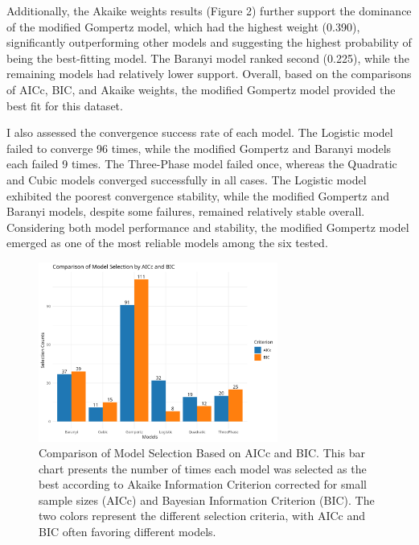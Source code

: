 \documentclass[12pt]{article}
\begin{document}
Additionally, the Akaike weights results (Figure 2) further support the dominance of the modified Gompertz model, which had the highest weight (0.390), significantly outperforming other models and suggesting the highest probability of being the best-fitting model. The Baranyi model ranked second (0.225), while the remaining models had relatively lower support. Overall, based on the comparisons of AICc, BIC, and Akaike weights, the modified Gompertz model provided the best fit for this dataset.

I also assessed the convergence success rate of each model. The Logistic model failed to converge 96 times, while the modified Gompertz and Baranyi models each failed 9 times. The Three-Phase model failed once, whereas the Quadratic and Cubic models converged successfully in all cases. The Logistic model exhibited the poorest convergence stability, while the modified Gompertz and Baranyi models, despite some failures, remained relatively stable overall. Considering both model performance and stability, the modified Gompertz model emerged as one of the most reliable models among the six tested.

\begin{figure}[H]
    \centering
    \includegraphics[width=0.7\textwidth]{"../results/model_selection_comparison.png"}
    \caption{Comparison of Model Selection Based on AICc and BIC. This bar chart presents the number of times each model was selected as the best according to Akaike Information Criterion corrected for small sample sizes (AICc) and Bayesian Information Criterion (BIC). The two colors represent the different selection criteria, with AICc and BIC often favoring different models.}
    \label{fig:model_selection}
\end{figure}

\vspace{-1em} %
\end{document}
